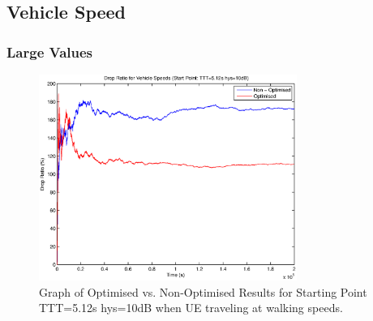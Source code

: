 \subsection{Vehicle Speed}
\subsubsection*{Large Values}
\begin{figure}[H]
  \begin{center}
    	  \includegraphics[width=0.75\textwidth]{figures/vehicle_figures/high/long_drop.eps}
    \end{center}
    \caption{Graph of Optimised vs. Non-Optimised Results for Starting Point TTT=5.12s hys=10dB when UE traveling at walking speeds.}
    \label{fig:veh_high_drop}
\end{figure}

